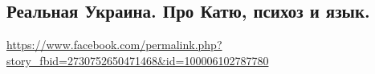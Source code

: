  
 
 
 
 

\subsection{Реальная Украина. Про Катю, психоз и язык.}
\label{sec:20_06_2020.fb.zharkih_denis.1.katja_psihoz_jazyk}
\url{https://www.facebook.com/permalink.php?story_fbid=2730752650471468&id=100006102787780}

